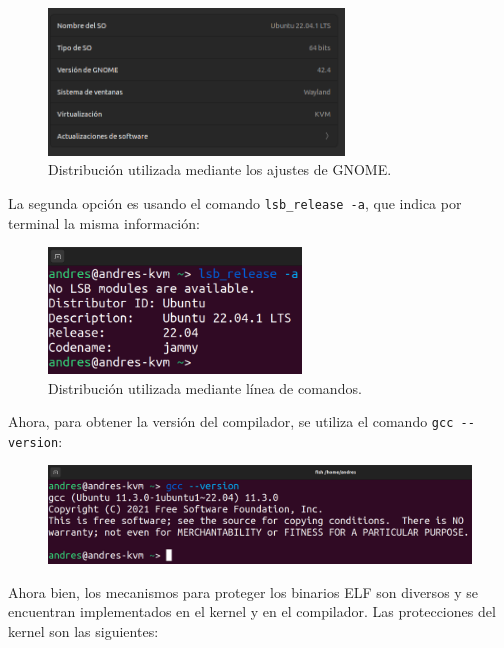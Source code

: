 \documentclass{article}
\begin{document}
\begin{figure}[H]
    \centering
    \includegraphics[width=0.7\textwidth]{imagenes/Captura desde 2022-11-23 10-37-46.png}
    \caption{Distribución utilizada mediante los ajustes de GNOME.}
\end{figure}

\bigskip

La segunda opción es usando el comando \verb|lsb_release -a|, que indica por terminal la misma información:

\begin{figure}[H]
    \centering
    \includegraphics[width=0.6\textwidth]{imagenes/Captura desde 2022-11-23 10-38-58.png}
    \caption{Distribución utilizada mediante línea de comandos.}
\end{figure}

\newpage

Ahora, para obtener la versión del compilador, se utiliza el comando \verb|gcc --version|:

\begin{figure}[H]
    \includegraphics[width=\textwidth]{imagenes/Captura desde 2022-11-23 10-39-52.png}
\end{figure}


Ahora bien, los mecanismos para proteger los binarios ELF son diversos y se encuentran implementados en el kernel y en el compilador. Las protecciones del kernel son las siguientes:
\end{document}
